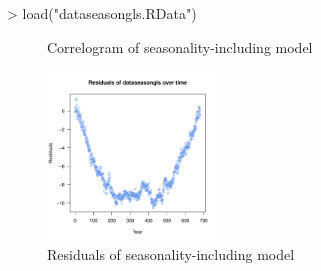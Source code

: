 \documentclass[10pt, a4paper]{article} %
\begin{document}
\begin{Schunk}
\begin{Sinput}
> load("dataseasongls.RData")
\end{Sinput}
\end{Schunk}

\begin{figure}[ht]
\begin{center}
\qquad
{}
\end{center}
\caption{Correlogram of seasonality-including model}
\label{corseas}
\end{figure}

\begin{Schunk}
\end{Schunk}

\begin{figure}[H]
 \begin{center}
\includegraphics[width=0.4\textwidth]{FINAL_VERSION-resseas.pdf}
\caption{Residuals of seasonality-including model}
\label{resseas}
\end{center}
\end{figure}
\end{document}
